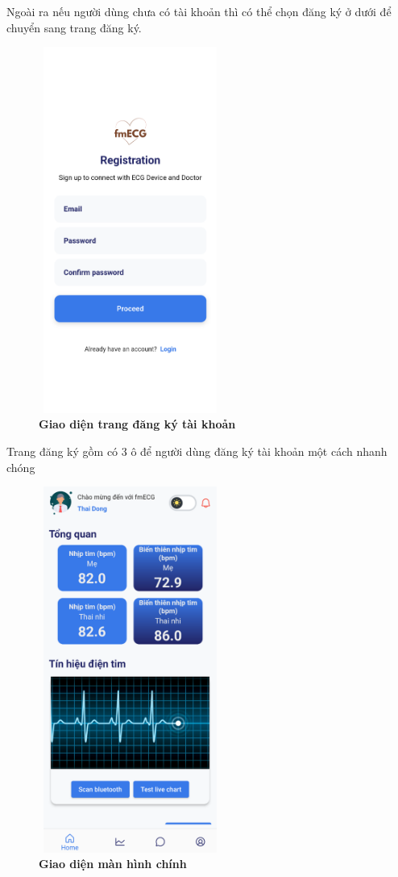 Ngoài ra nếu người dùng chưa có tài khoản thì có thể chọn đăng ký ở dưới để chuyển sang trang đăng ký.

\begin{figure}[H]
  \centering
  \includegraphics[width=6cm,height=12cm]{Images/mobile_app/demo/register.png}
  \caption[Giao diện trang đăng ký tài khoản]{\bfseries \fontsize{12pt}{0pt}\selectfont Giao diện trang đăng ký tài khoản}
  \label{demo_register} %
\end{figure}

Trang đăng ký gồm có 3 ô để người dùng đăng ký tài khoản một cách nhanh chóng

\begin{figure}[H]
  \centering
  \includegraphics[width=6cm,height=12cm]{Images/mobile_app/demo/home_screen.png}
  \caption[Giao diện màn hình chính]{\bfseries \fontsize{12pt}{0pt}\selectfont Giao diện màn hình chính}
  \label{demo_} %
\end{figure}

